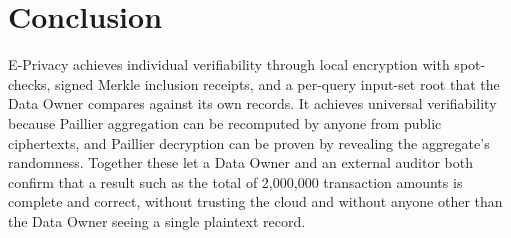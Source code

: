 \documentclass[12pt]{article}
\begin{document}
\section{Conclusion}
E-Privacy achieves individual verifiability through local encryption with spot-checks, signed Merkle inclusion receipts, and a per-query input-set root that the Data Owner compares against its own records. It achieves universal verifiability because Paillier aggregation can be recomputed by anyone from public ciphertexts, and Paillier decryption can be proven by revealing the aggregate's randomness. Together these let a Data Owner and an external auditor both confirm that a result such as the total of 2,000,000 transaction amounts is complete and correct, without trusting the cloud and without anyone other than the Data Owner seeing a single plaintext record.
\end{document}
